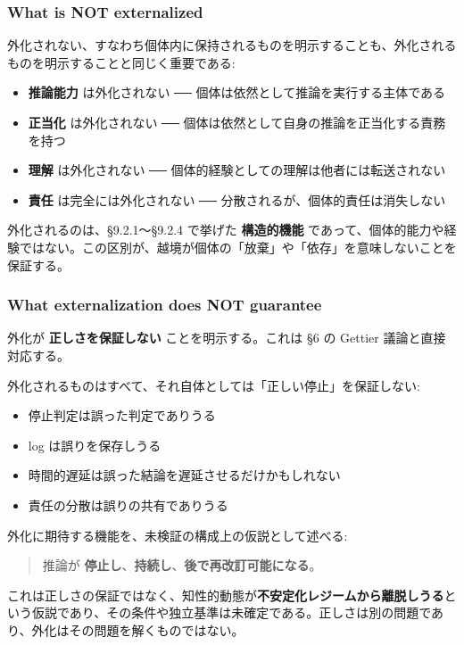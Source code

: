 \subsubsection{What is NOT externalized}


外化されない、すなわち個体内に保持されるものを明示することも、外化されるものを明示することと同じく重要である:

\begin{itemize}
\item \textbf{推論能力} は外化されない ── 個体は依然として推論を実行する主体である
\item \textbf{正当化} は外化されない ── 個体は依然として自身の推論を正当化する責務を持つ
\item \textbf{理解} は外化されない ── 個体的経験としての理解は他者には転送されない
\item \textbf{責任} は完全には外化されない ── 分散されるが、個体的責任は消失しない
\end{itemize}

外化されるのは、\S{}9.2.1〜\S{}9.2.4 で挙げた \textbf{構造的機能} であって、個体的能力や経験ではない。この区別が、越境が個体の「放棄」や「依存」を意味しないことを保証する。

\subsubsection{What externalization does NOT guarantee}


外化が \textbf{正しさを保証しない} ことを明示する。これは \S{}6 の Gettier 議論と直接対応する。

外化されるものはすべて、それ自体としては「正しい停止」を保証しない:

\begin{itemize}
\item 停止判定は誤った判定でありうる
\item log は誤りを保存しうる
\item 時間的遅延は誤った結論を遅延させるだけかもしれない
\item 責任の分散は誤りの共有でありうる
\end{itemize}

外化に期待する機能を、未検証の構成上の仮説として述べる:

\begin{quote}
推論が \textbf{停止し}、\textbf{持続し}、\textbf{後で再改訂可能になる}。
\end{quote}

これは正しさの保証ではなく、知性的動態が\textbf{不安定化レジームから離脱しうる}という仮説であり、その条件や独立基準は未確定である。正しさは別の問題であり、外化はその問題を解くものではない。

